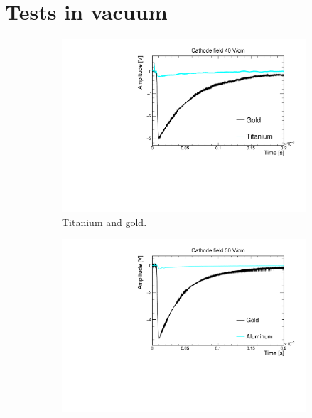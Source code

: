 \documentclass[a4paper,11pt]{article}
\begin{document}
\section{Tests in vacuum}
\label{sec:tests_vacuum}
\begin{figure}[tb]
    \begin{subfigure}[h]{0.45\textwidth}\centering\captionsetup{singlelinecheck = false, format= hang, justification=raggedright, font=footnotesize, labelsep=space}
            \includegraphics[scale=0.35]{figures/TitaniumVSGold_40Vcm.pdf}
        \caption{Titanium and gold.}
        \label{fig:titanium}
    \end{subfigure}
    \hfill
    \begin{subfigure}[h]{0.45\textwidth}\centering\centering\captionsetup{singlelinecheck = false, format= hang, justification=raggedright, font=footnotesize, labelsep=space}
            \includegraphics[scale=0.35]{figures/AluminumVSGold_50Vcm.pdf}

\end{subfigure}
\end{figure}
\end{document}
